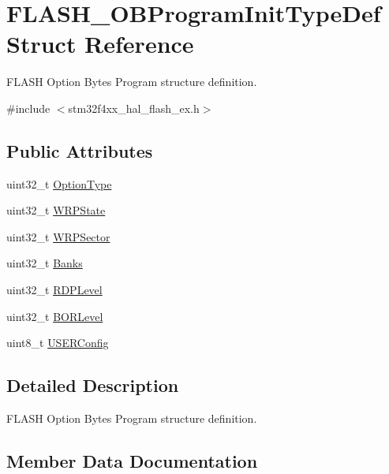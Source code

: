 \hypertarget{struct_f_l_a_s_h___o_b_program_init_type_def}{}\section{F\+L\+A\+S\+H\+\_\+\+O\+B\+Program\+Init\+Type\+Def Struct Reference}
\label{struct_f_l_a_s_h___o_b_program_init_type_def}


F\+L\+A\+SH Option Bytes Program structure definition.  




{\ttfamily \#include $<$stm32f4xx\+\_\+hal\+\_\+flash\+\_\+ex.\+h$>$}

\subsection*{Public Attributes}
\begin{DoxyCompactItemize}
\item 
uint32\+\_\+t \hyperlink{struct_f_l_a_s_h___o_b_program_init_type_def_a46bffc2a63ea02e15b9187856535d890}{Option\+Type}
\item 
uint32\+\_\+t \hyperlink{struct_f_l_a_s_h___o_b_program_init_type_def_a2607ba046f7a3af46e7209b8f1e9e20d}{W\+R\+P\+State}
\item 
uint32\+\_\+t \hyperlink{struct_f_l_a_s_h___o_b_program_init_type_def_aa3db423f4b3038a56b67ca2d48af79ff}{W\+R\+P\+Sector}
\item 
uint32\+\_\+t \hyperlink{struct_f_l_a_s_h___o_b_program_init_type_def_a5fdf437b5f79d79945f5c0777f76d0eb}{Banks}
\item 
uint32\+\_\+t \hyperlink{struct_f_l_a_s_h___o_b_program_init_type_def_a1f613ba2b87cf9caa84dc1d493e96dae}{R\+D\+P\+Level}
\item 
uint32\+\_\+t \hyperlink{struct_f_l_a_s_h___o_b_program_init_type_def_a51a6af507ed8f57590f19b6ba6c9c33d}{B\+O\+R\+Level}
\item 
uint8\+\_\+t \hyperlink{struct_f_l_a_s_h___o_b_program_init_type_def_ae6c9b55d49bc9627a2319ba680a924de}{U\+S\+E\+R\+Config}
\end{DoxyCompactItemize}


\subsection{Detailed Description}
F\+L\+A\+SH Option Bytes Program structure definition. 

\subsection{Member Data Documentation}
